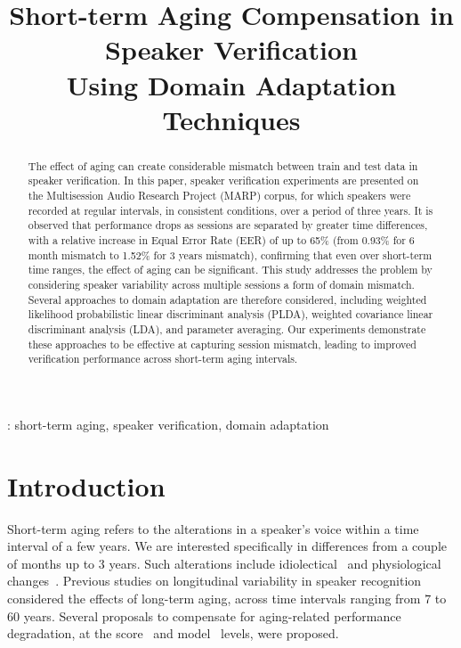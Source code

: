 \documentclass[a4paper]{article}
\title{Short-term Aging Compensation in Speaker Verification\\Using Domain Adaptation Techniques}
\begin{document}
  \maketitle
  \begin{abstract}
The effect of aging can create considerable mismatch between train and test data in speaker verification. In this paper, speaker verification experiments are presented on the Multisession Audio Research Project (MARP) corpus, for which speakers were recorded at regular intervals, in consistent conditions, over a period of three years. It is observed that performance drops as sessions are separated by greater time differences, with a relative increase in Equal Error Rate (EER) of up to 65\% (from 0.93\% for 6 month mismatch to 1.52\% for 3 years mismatch), confirming that even over short-term time ranges, the effect of aging can be significant. This study addresses the problem by considering speaker variability across multiple sessions a form of domain mismatch. Several approaches to domain adaptation are therefore considered, including weighted likelihood probabilistic linear discriminant analysis (PLDA), weighted covariance linear discriminant analysis (LDA), and parameter averaging. Our experiments demonstrate these approaches to be effective at capturing session mismatch, leading to improved verification performance across short-term aging intervals.
  \end{abstract}
  : short-term aging, speaker verification, domain adaptation

\section{Introduction}

Short-term aging refers to the alterations in a speaker's voice within a time interval of a few years. We are interested specifically in differences from a couple of months up to $3$ years. Such alterations include idiolectical~\cite{paper3,paper4} and physiological changes~\cite{paper5,paper6}. Previous studies on longitudinal variability in speaker recognition~\cite{paper7, paper9,paper10,paper11} considered the effects of long-term aging, across time intervals ranging from $7$ to $60$ years. Several proposals to compensate for aging-related performance degradation, at the score~\cite{paper11} and model~\cite{paper10} levels, were proposed. 
\end{document}
